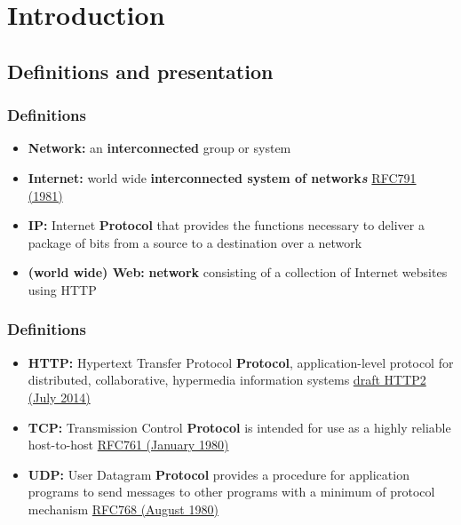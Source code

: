 \section{Introduction}
\subsection{Definitions and presentation}
  \begin{frame}
    \frametitle{Definitions}
      \begin{itemize}
        \item \textbf{Network:} an \textbf{interconnected} group or system\pause
        \item \textbf{Internet:} world wide \textbf{interconnected system of network\emph{s}} \color{blue}\href{http://tools.ietf.org/html/rfc791}{RFC791 (1981)}\color{black}\pause
        \item \textbf{IP:} Internet \textbf{Protocol} that provides the functions necessary to deliver a package of bits from a source to a destination over a network\pause
        \item \textbf{(world wide) Web:} \textbf{network} consisting of a collection of Internet websites using HTTP
      \end{itemize}
  \end{frame}
  \begin{frame}
    \frametitle{Definitions}
      \begin{itemize}
        \item \textbf{HTTP:} Hypertext Transfer Protocol \textbf{Protocol}, application-level protocol for distributed, collaborative, hypermedia information systems \color{blue}\href{http://tools.ietf.org/html/draft-ietf-httpbis-http2-14}{draft HTTP2 (July 2014)} \color{black}\pause
        \item \textbf{TCP:} Transmission Control \textbf{Protocol} is intended for use as a highly reliable host-to-host \color{blue}\href{http://tools.ietf.org/html/rfc761}{RFC761 (January 1980)} \color{black} \pause
        \item \textbf{UDP:} User Datagram \textbf{Protocol} provides  a procedure  for application  programs  to send messages  to other programs  with a minimum  of protocol mechanism \color{blue}\href{http://tools.ietf.org/html/rfc768}{RFC768 (August 1980)} \color{black}
      \end{itemize}
  \end{frame}
